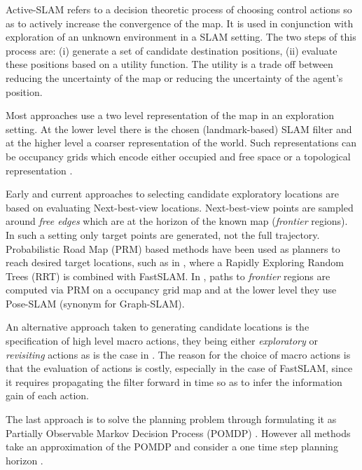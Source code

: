 Active-SLAM refers to a decision theoretic process of choosing control actions so as to actively 
increase the convergence of the map. It is used in conjunction with exploration of an unknown environment
in a SLAM setting. The two steps of this process are: (i) generate a set of 
candidate destination positions, (ii) evaluate these positions based on a utility function. The utility  
is a trade off between reducing the uncertainty of the map or reducing the uncertainty
of the agent's position.

Most approaches use a two level representation of the map in an exploration setting. At the lower level
there is the chosen (landmark-based) SLAM filter and at the higher level a coarser representation of the world.
Such representations can be occupancy grids \cite{Thrun_grid_based_1996} which encode either occupied and free space
or a topological representation \cite{Kollar_2008_Exploration_SLAM}.

Early and current approaches to selecting candidate exploratory locations are based on evaluating 
Next-best-view \cite{Navigation_strategires_for_exploring_indoor_environments} locations. Next-best-view points are 
sampled around \textit{free edges} which are at the horizon of the known map (\textit{frontier} regions). 
In such a setting only target points are generated, not the full trajectory. Probabilistic Road Map (PRM) \cite{PRM_1996}
based methods have been used as planners to reach desired target locations, such as in \cite{RRT-SLAM}, where a Rapidly
Exploring Random Trees (RRT) is combined with FastSLAM. In \cite{ActivePosSLAM}, paths to \textit{frontier} regions are computed
via PRM  on a occupancy grid map and at the lower level they use Pose-SLAM (synonym for Graph-SLAM).

An alternative approach taken to generating candidate locations is the specification of high level macro actions, they being either 
\textit{exploratory} or \textit{revisiting} actions as is the case in \cite{stachniss05robotics}. The reason for the choice of macro actions is that the evaluation
of actions is costly, especially in the case of FastSLAM, since it requires propagating the filter 
forward in time so as to infer the information gain of each action.

The last approach is to solve the planning problem through formulating it as  Partially Observable Markov Decision Process (POMDP) \cite{Ross08onlineplanning}. 
However all methods take an approximation of the POMDP and consider a one time step planning horizon \cite[p.37]{GeorgiosLidoris}.

